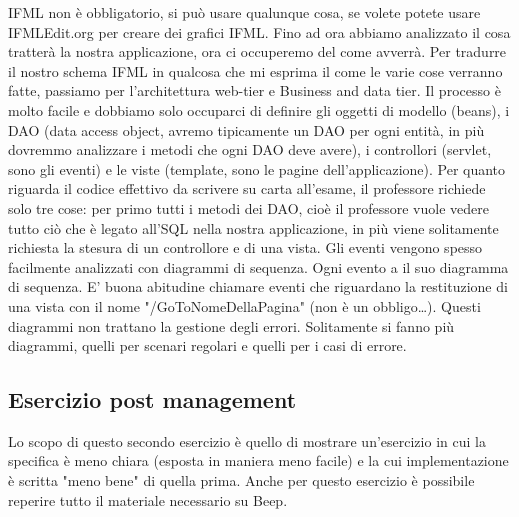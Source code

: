 IFML non è obbligatorio, si può usare qualunque cosa, se volete potete usare IFMLEdit.org per creare dei grafici IFML.\newline
\newline
Fino ad ora abbiamo analizzato il cosa tratterà la nostra applicazione, ora ci occuperemo del come avverrà.\newline
\newline
Per tradurre il nostro schema IFML in qualcosa che mi esprima il come le varie cose verranno fatte, passiamo per l'architettura web-tier e Business and data tier. Il processo è molto facile e dobbiamo solo occuparci di definire gli oggetti di modello (beans), i DAO (data access object, avremo tipicamente un DAO per ogni entità, in più dovremmo analizzare i metodi che ogni DAO deve avere), i controllori (servlet, sono gli eventi) e le viste (template, sono le pagine dell'applicazione).\newline
\newline
Per quanto riguarda il codice effettivo da scrivere su carta all'esame, il professore richiede solo tre cose: per primo tutti i metodi dei DAO, cioè il professore vuole vedere tutto ciò che è legato all'SQL nella nostra applicazione, in più viene solitamente richiesta la stesura di un controllore e di una vista.\newline
\newline
Gli eventi vengono spesso facilmente analizzati con diagrammi di sequenza. Ogni evento a il suo diagramma di sequenza.\newline
E' buona abitudine chiamare eventi che riguardano la restituzione di una vista con il nome "/GoToNomeDellaPagina" (non è un obbligo\dots).\newline
Questi diagrammi non trattano la gestione degli errori. Solitamente si fanno più diagrammi, quelli per scenari regolari e quelli per i casi di errore.
\subsection{Esercizio post management}
Lo scopo di questo secondo esercizio è quello di mostrare un'esercizio in cui la specifica è meno chiara (esposta in maniera meno facile) e la cui implementazione è scritta "meno bene" di quella prima.\newline
\newline
Anche per questo esercizio è possibile reperire tutto il materiale necessario su Beep.\newline
\newline
